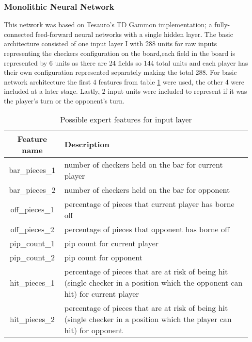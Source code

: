 \documentclass[12pt,a4paper]{article}
\begin{document}
\subsubsection{Monolithic Neural Network}
This network was based on Tesauro's \citeyear{DBLP:journals/neco/Tesauro94} TD Gammon implementation; a fully-connected feed-forward neural networks with a single hidden layer. The basic architecture consisted of one input layer I with 288 units for raw inputs representing the checkers configuration on the board,each field in the board is represented by 6 units as there are 24 fields so 144 total units and each player has their own configuration represented separately making the total 288. For basic network architecture the first 4 features from table \ref{exfeat} were used, the other 4 were included at a later stage. Lastly, 2 input units were included to represent if it was the player's turn or the opponent's turn. 
\begin{table}[htb]
    \centering
    \caption{Possible expert features for input layer}
    \vspace*{6pt}
    \label{exfeat}
    \begin{tabular}{cp{12cm}}
        \hline
        \hline
        Feature name & Description \\ 
        \hline
        bar\_pieces\_1 & number of checkers held on the bar for current player\\
        \hline
        bar\_pieces\_2 & number of checkers held on the bar for opponent\\
        \hline
        off\_pieces\_1 & percentage of pieces that current player has borne off \\
        \hline
        off\_pieces\_2 & percentage of pieces that opponent has borne off \\
        \hline
        pip\_count\_1 & pip count for current player \\
        \hline
        pip\_count\_2 & pip count for opponent \\
        \hline
        hit\_pieces\_1 & percentage of pieces that are at risk of being hit (single checker in a position which the opponent can hit) for current player \\
        \hline
        hit\_pieces\_2 & percentage of pieces that are at risk of being hit (single checker in a position which the player can hit) for opponent\\
        \hline
    \end{tabular}
\end{table}
\end{document}
